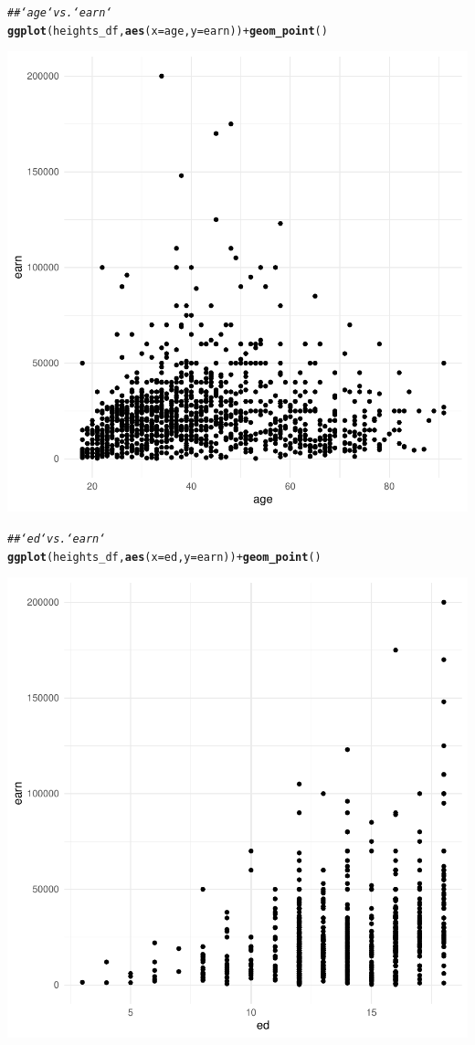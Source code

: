 \documentclass{article}\usepackage[]{graphicx}\usepackage[]{xcolor}
\makeatletter
\newcommand{\hlcom}[1]{\textcolor[rgb]{0.678,0.584,0.686}{\textit{#1}}}%
\newcommand{\hlopt}[1]{\textcolor[rgb]{0,0,0}{#1}}%
\newcommand{\hlstd}[1]{\textcolor[rgb]{0.345,0.345,0.345}{#1}}%
\newcommand{\hlkwc}[1]{\textcolor[rgb]{0.333,0.667,0.333}{#1}}%
\newcommand{\hlkwd}[1]{\textcolor[rgb]{0.737,0.353,0.396}{\textbf{#1}}}%
\newenvironment{kframe}{%
 \def\at@end@of@kframe{}%
 \ifinner\ifhmode%
  \def\at@end@of@kframe{\end{minipage}}%
  \begin{minipage}{\columnwidth}%
 \fi\fi%
 \def\FrameCommand##1{\hskip\@totalleftmargin \hskip-\fboxsep
 \colorbox{shadecolor}{##1}\hskip-\fboxsep
     \hskip-\linewidth \hskip-\@totalleftmargin \hskip\columnwidth}%
 \MakeFramed {\advance\hsize-\width
   \@totalleftmargin\z@ \linewidth\hsize
   \@setminipage}}%
 {\par\unskip\endMakeFramed%
 \at@end@of@kframe}
\newenvironment{knitrout}{}{} %
\makeatother
\begin{document}
\begin{knitrout}
\begin{kframe}\begin{alltt}
\hlcom{## `age` vs. `earn`}
\hlkwd{ggplot}\hlstd{(heights_df,} \hlkwd{aes}\hlstd{(}\hlkwc{x}\hlstd{=age,} \hlkwc{y}\hlstd{=earn))} \hlopt{+} \hlkwd{geom_point}\hlstd{()}
\end{alltt}
\end{kframe}

{\centering \includegraphics[width=.6\linewidth]{figure/assignment-03-Reppeto-Brian-Rnwauto-report-2} 

}


\begin{kframe}\begin{alltt}
\hlcom{## `ed` vs. `earn`}
\hlkwd{ggplot}\hlstd{(heights_df,} \hlkwd{aes}\hlstd{(}\hlkwc{x}\hlstd{=ed,} \hlkwc{y}\hlstd{=earn))} \hlopt{+} \hlkwd{geom_point}\hlstd{()}
\end{alltt}
\end{kframe}

{\centering \includegraphics[width=.6\linewidth]{figure/assignment-03-Reppeto-Brian-Rnwauto-report-3} 

}
\end{knitrout}
\end{document}
